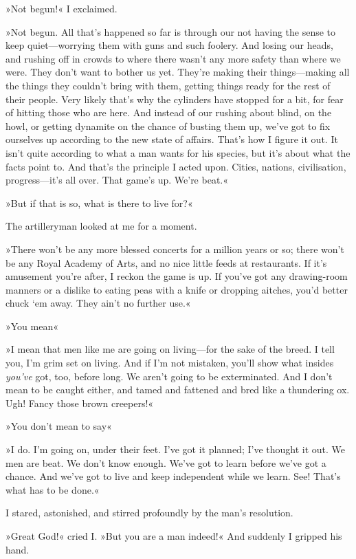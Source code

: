 »Not begun!« I exclaimed.

»Not begun. All that's happened so far is through our not having the sense to keep quiet—worrying them with guns and such foolery. And losing our heads, and rushing off in crowds to where there wasn't any more safety than where we were. They don't want to bother us yet. They're making their things—making all the things they couldn't bring with them, getting things ready for the rest of their people. Very likely that's why the cylinders have stopped for a bit, for fear of hitting those who are here. And instead of our rushing about blind, on the howl, or getting dynamite on the chance of busting them up, we've got to fix ourselves up according to the new state of affairs. That's how I figure it out. It isn't quite according to what a man wants for his species, but it's about what the facts point to. And that's the principle I acted upon. Cities, nations, civilisation, progress—it's all over. That game's up. We're beat.«

»But if that is so, what is there to live for?«

The artilleryman looked at me for a moment.

»There won't be any more blessed concerts for a million years or so; there won't be any Royal Academy of Arts, and no nice little feeds at restaurants. If it's amusement you're after, I reckon the game is up. If you've got any drawing-room manners or a dislike to eating peas with a knife or dropping aitches, you'd better chuck `em away. They ain't no further use.«

»You mean\longdash«

»I mean that men like me are going on living—for the sake of the breed. I tell you, I'm grim set on living. And if I'm not mistaken, you'll show what insides \textit{you've} got, too, before long. We aren't going to be exterminated. And I don't mean to be caught either, and tamed and fattened and bred like a thundering ox. Ugh! Fancy those brown creepers!«

»You don't mean to say\longdash«

»I do. I'm going on, under their feet. I've got it planned; I've thought it out. We men are beat. We don't know enough. We've got to learn before we've got a chance. And we've got to live and keep independent while we learn. See! That's what has to be done.«

I stared, astonished, and stirred profoundly by the man's resolution.

»Great God!« cried I. »But you are a man indeed!« And suddenly I gripped his hand.

